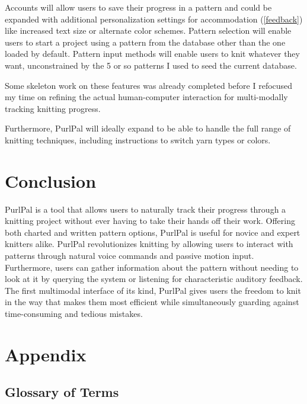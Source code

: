 \documentclass[11pt,twocolumn]{article}
\begin{document}
Accounts will allow users to save their progress in a pattern and could be expanded with additional personalization settings for accommodation (\ref{feedback}) like increased text size or alternate color schemes.
Pattern selection will enable users to start a project using a pattern from the database other than the one loaded by default.
Pattern input methods will enable users to knit whatever they want, unconstrained by the 5 or so patterns I used to seed the current database.

Some skeleton work on these features was already completed before I refocused my time on refining the actual human-computer interaction for multi-modally tracking knitting progress.

Furthermore, PurlPal will ideally expand to be able to handle the full range of knitting techniques, including instructions to switch yarn types or colors.

\section{Conclusion} \label{conc}

PurlPal is a tool that allows users to naturally track their progress through a knitting project without ever having to take their hands off their work.
Offering both charted and written pattern options, PurlPal is useful for novice and expert knitters alike.
PurlPal revolutionizes knitting by allowing users to interact with patterns through natural voice commands and passive motion input.
Furthermore, users can gather information about the pattern without needing to look at it by querying the system or listening for characteristic auditory feedback.
The first multimodal interface of its kind, PurlPal gives users the freedom to knit in the way that makes them most efficient while simultaneously guarding against time-consuming and tedious mistakes.

\onecolumn
\section{Appendix}

\subsection{Glossary of Terms} \label{terms}

\end{document}
